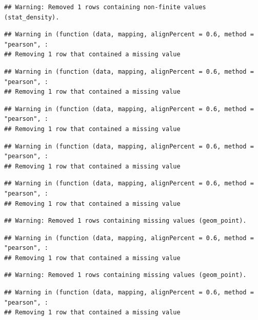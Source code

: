 \documentclass[]{article}
\begin{document}
\begin{verbatim}
## Warning: Removed 1 rows containing non-finite values (stat_density).
\end{verbatim}

\begin{verbatim}
## Warning in (function (data, mapping, alignPercent = 0.6, method = "pearson", :
## Removing 1 row that contained a missing value
\end{verbatim}

\begin{verbatim}
## Warning in (function (data, mapping, alignPercent = 0.6, method = "pearson", :
## Removing 1 row that contained a missing value
\end{verbatim}

\begin{verbatim}
## Warning in (function (data, mapping, alignPercent = 0.6, method = "pearson", :
## Removing 1 row that contained a missing value
\end{verbatim}

\begin{verbatim}
## Warning in (function (data, mapping, alignPercent = 0.6, method = "pearson", :
## Removing 1 row that contained a missing value
\end{verbatim}

\begin{verbatim}
## Warning in (function (data, mapping, alignPercent = 0.6, method = "pearson", :
## Removing 1 row that contained a missing value
\end{verbatim}

\begin{verbatim}
## Warning: Removed 1 rows containing missing values (geom_point).
\end{verbatim}

\begin{verbatim}
## Warning in (function (data, mapping, alignPercent = 0.6, method = "pearson", :
## Removing 1 row that contained a missing value
\end{verbatim}

\begin{verbatim}
## Warning: Removed 1 rows containing missing values (geom_point).
\end{verbatim}

\begin{verbatim}
## Warning in (function (data, mapping, alignPercent = 0.6, method = "pearson", :
## Removing 1 row that contained a missing value
\end{verbatim}
\end{document}

